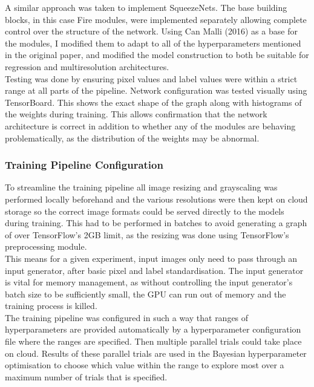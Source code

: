 \documentclass{article}
\begin{document}
{A similar approach was taken to implement SqueezeNets. The base building blocks, in this case Fire modules, were implemented separately allowing complete control over the structure of the network. Using Can Malli (2016) as a base for the modules, I modified them to adapt to all of the hyperparameters mentioned in the original paper, and modified the model construction to both be suitable for regression and multiresolution architectures. \\

Testing was done by ensuring pixel values and label values were within a strict range at all parts of the pipeline. Network configuration was tested visually using TensorBoard. This shows the exact shape of the graph along with histograms of the weights during training. This  allows confirmation that the network architecture is correct in addition to whether any of the modules are behaving problematically, as the distribution of the weights may be abnormal.

\subsubsection{Training Pipeline Configuration}
To streamline the training pipeline all image resizing and grayscaling was performed locally beforehand and the various resolutions were then kept on cloud storage so the correct image formats could be served directly to the models during training. This had to be performed in batches to avoid generating a graph of over TensorFlow's 2GB limit, as the resizing was done using TensorFlow's preprocessing module. \\

This means for a given experiment, input images only need to pass through an input generator, after basic pixel and label standardisation. The input generator is vital for memory management, as without controlling the input generator's batch size to be sufficiently small, the GPU can run out of memory and the training process is killed.\\

The training pipeline was configured in such a way that ranges of hyperparameters are provided automatically by a hyperparameter configuration file where the ranges are specified. Then multiple parallel trials could take place on cloud. Results of these parallel trials are used in the Bayesian hyperparameter optimisation to choose which value within the range to explore most over a maximum number of trials that is specified. \\

}
\end{document}
